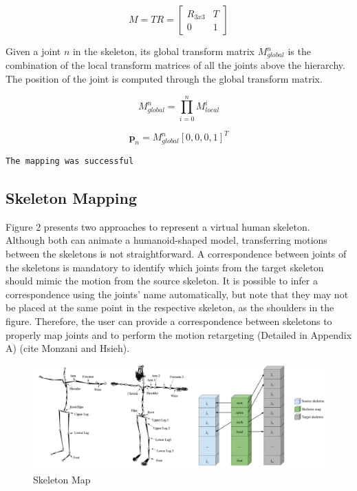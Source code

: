 \documentclass{vgtc}
\makeatletter
\def\maxwidth{\ifdim\Gin@nat@width>\linewidth\linewidth
    \else\Gin@nat@width\fi}
\let\Oldincludegraphics\includegraphics
\renewcommand{\includegraphics}[1]{\Oldincludegraphics[width=.8\maxwidth]{#1}}
\makeatother
\begin{document}
\begin{equation}
\label{eq:transformmatrix}
M = TR = \begin{bmatrix}
    R_{3x3} & T \\
    0 & 1
    \end{bmatrix}
\end{equation}

Given a joint \(n\) in the skeleton, its global transform matrix
\(M_{global}^{n}\) is the combination of the local transform matrices of
all the joints above the hierarchy. The position of the joint is
computed through the global transform matrix.

\begin{equation}
\label{eq:transformmatrixglobal}
M_{global}^{n} = \prod_{i=0}^{n} M_{local}^{i}
\end{equation}

\begin{equation}
\label{eq:position}
\mathbf{p}_{n} = M_{global}^{n}[0,0,0,1]^T
\end{equation}


    \begin{Verbatim}[commandchars=\\\{\}]
The mapping was successful

    \end{Verbatim}



    \subsection{Skeleton Mapping}\label{skeleton-mapping}

Figure 2 presents two approaches to represent a virtual human skeleton.
Although both can animate a humanoid-shaped model, transferring motions
between the skeletons is not straightforward. A correspondence between
joints of the skeletons is mandatory to identify which joints from the
target skeleton should mimic the motion from the source skeleton. It is
possible to infer a correspondence using the joints' name automatically,
but note that they may not be placed at the same point in the respective
skeleton, as the shoulders in the figure. Therefore, the user can
provide a correspondence between skeletons to properly map joints and to
perform the motion retargeting (Detailed in Appendix A) (cite Monzani
and Hsieh).

\begin{figure}
\centering
\includegraphics{../figures/skelmap.png}
\caption{Skeleton Map}
\end{figure}
\end{document}

